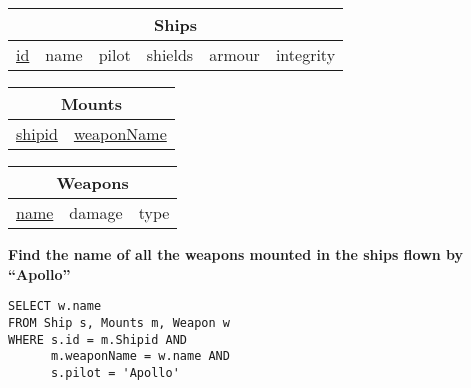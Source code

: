 \documentclass{beamer}
\begin{document}
\begin{frame}[fragile]

\begin{tabular}{|c|c|c|c|c|c|}
\hline
\multicolumn{6}{|c|}{\textbf{Ships}} \\
\hline
\underline{id} & name & pilot & shields  & armour & integrity \\
\hline
\end{tabular}

\begin{tabular}{|c|c|}
\hline
\multicolumn{2}{|c|}{\textbf{Mounts}} \\
\hline
\underline{shipid} & \underline{weaponName} \\
\hline
\end{tabular}

\begin{tabular}{|c|c|c|}
\hline
\multicolumn{3}{|c|}{\textbf{Weapons}} \\
\hline
\underline{name} & damage & type \\
\hline
\end{tabular}

\vspace{0.25cm}
\textbf{Find the name of all the weapons mounted in the ships flown by ``Apollo''}

\pause
\begin{lstlisting}[showstringspaces=false]
SELECT w.name
FROM Ship s, Mounts m, Weapon w
WHERE s.id = m.Shipid AND 
      m.weaponName = w.name AND
      s.pilot = 'Apollo'
\end{lstlisting}

\end{frame}
\end{document}
